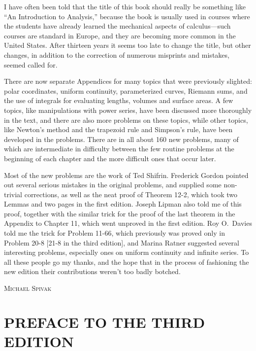 I have often been told that the title of this book should really be something
like ``An Introduction to Analysis,'' because the book is usually used in
courses where the students have already learned the mechanical aspects of
calculus---such courses are standard in Europe, and they are becoming more
common in the United States. After thirteen years it seems too late to change
the title, but other changes, in addition to the correction of numerous
misprints and mistakes, seemed called for.

There are now separate Appendices for many topics that were previously
slighted: polar coordinates, uniform continuity, parameterized curves,
Riemann sums, and the use of integrals for evaluating lengths, volumes and
surface areas. A few topics, like manipulations with power series, have been
discussed more thoroughly in the text, and there are also more problems on
these topics, while other topics, like Newton's method and the trapezoid rule
and Simpson's rule, have been developed in the problems. There are in all
about 160 new problems, many of which are intermediate in difficulty between
the few routine problems at the beginning of each chapter and the more
difficult ones that occur later.

Most of the new problems are the work of Ted Shifrin. Frederick Gordon pointed
out several serious mistakes in the original problems, and supplied some
non-trivial corrections, as well as the neat proof of Theorem 12-2, which took
two Lemmas and two pages in the first edition. Joseph Lipman also told me of
this proof, together with the similar trick for the proof of the last theorem
in the Appendix to Chapter 11, which went unproved in the first edition.
Roy O.~Davies told me the trick for Problem 11-66, which previously was proved
only in Problem 20-8 [21-8 in the third edition], and Marina Ratner suggested
several interesting problems, especially ones on uniform continuity and
infinite series. To all these people go my thanks, and the hope that in the
process of fashioning the new edition their contributions weren't too badly
botched.

\begin{flushright}
  \begin{minipage}{0.4\textwidth}
    \vspace{2em}
    \scshape Michael Spivak
  \end{minipage}
\end{flushright}

\clearpage
\section*{\mdseries PREFACE TO THE THIRD EDITION}

